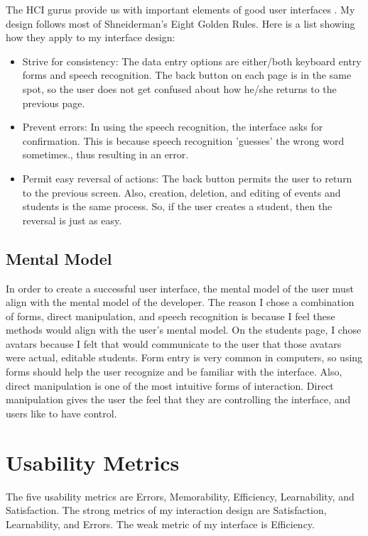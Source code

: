 \documentclass{article}
\begin{document}
The HCI gurus provide us with important elements of good user interfaces \cite{principles}.  My design follows most of Shneiderman's Eight Golden Rules.  Here is a list showing how they apply to my interface design:

\begin{itemize}
\item Strive for consistency:  The data entry options are either/both keyboard entry forms and speech recognition.  The back button on each page is in the same spot, so the user does not get confused about how he/she returns to the previous page.
\item Prevent errors: In using the speech recognition, the interface asks for confirmation.  This is because speech recognition 'guesses' the wrong word sometimes., thus resulting in an error.
\item Permit easy reversal of actions: The back button permits the user to return to the previous screen.  Also, creation, deletion, and editing of events and students is the same process.  So, if the user creates a student, then the reversal is just as easy.
\end{itemize}

\subsection{Mental Model}

In order to create a successful user interface, the mental model of the user must align with the mental model of the developer.  The reason I chose a combination of forms, direct manipulation, and speech recognition is because I feel these methods would align with the user's mental model.  On the students page, I chose avatars because I felt that would communicate to the user that those avatars were actual, editable students.  Form entry is very common in computers, so using forms should help the user recognize and be familiar with the interface.  Also, direct manipulation is one of the most intuitive forms of interaction.  Direct manipulation gives the user the feel that they are controlling the interface, and users like to have control.


\section{Usability Metrics}

The five usability metrics are Errors, Memorability, Efficiency, Learnability, and Satisfaction.  The strong metrics of my interaction design are Satisfaction, Learnability, and Errors.  The weak metric of my interface is Efficiency.
\end{document}
